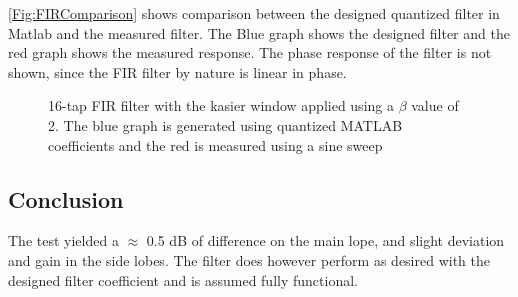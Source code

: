\autoref{Fig:FIRComparison} shows comparison between the designed quantized filter in Matlab and the measured filter. The Blue graph shows the designed filter and the red graph shows the measured response. The phase response of the filter is not shown, since the FIR filter by nature is linear in phase.
	
%	

\begin{figure}[H]
	\centering
	
	\caption{16-tap FIR filter with the kasier window applied using a $\beta$ value of 2. The blue graph is generated using quantized MATLAB coefficients and the red is measured using a sine sweep} 
	\label{Fig:FIRComparison}
\end{figure}

\subsection{Conclusion}
The test yielded a $\approx$ 0.5 dB of difference on the main lope, and slight deviation and gain in the side lobes. The filter does however perform as desired with the designed filter coefficient and is assumed fully functional.



